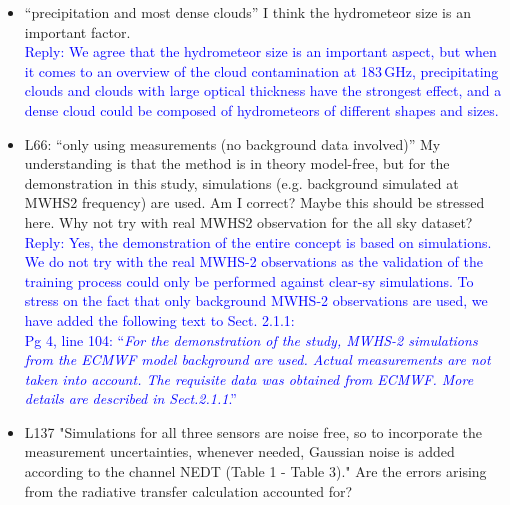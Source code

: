 \documentclass[11pt,a4paper,draft]{article}
\begin{document}
\begin{itemize}

\item 	``precipitation and most dense clouds'' I think the hydrometeor size is an important factor.\\
		
		
\textcolor{blue}{Reply: We agree that the hydrometeor size is an important aspect, but when it comes to an overview of the cloud contamination at 183\,GHz, precipitating clouds and clouds with large optical thickness have the strongest effect, and a dense cloud could be composed of hydrometeors of different shapes and sizes. }\\
		
		
\item	L66: ``only using measurements (no background data involved)'' My understanding is
		that the method is in theory model-free, but for the demonstration in this study, simulations (e.g. background simulated at MWHS2 frequency) are used. Am I correct?
		Maybe this should be stressed here. Why not try with real MWHS2 observation for the
		all sky dataset?\\
		
\textcolor{blue}{Reply: Yes, the demonstration of the entire concept is based on simulations. We do not try with the real MWHS-2 observations as the validation of the training process could only be performed against clear-sy simulations. To stress on the fact that only background MWHS-2 observations are used, we have added the following text to Sect. 2.1.1:\\
Pg 4, line 104:
``\textit{For the demonstration of the study, MWHS-2 simulations from the ECMWF model background are used. Actual measurements are not taken into account. The requisite data was obtained from ECMWF. More details are described in Sect.2.1.1}.''} \\
		
		
\item
		L137 "Simulations for all three sensors are noise free, so to incorporate the measurement uncertainties, whenever needed, Gaussian noise is added according to the channel NEDT (Table 1 - Table 3)." Are the errors arising from the radiative transfer calculation accounted for?\\
		

\end{itemize}
\end{document}
